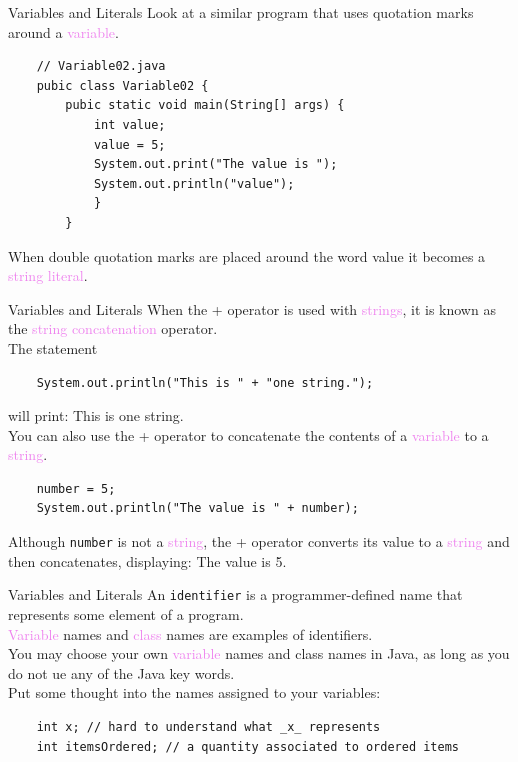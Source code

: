 \documentclass[11pt]{beamer}
\newcommand{\violet}[1]{\textcolor{violet}{#1}}
\begin{document}
\begin{frame}[fragile]{Variables and Literals}
    Look at a similar program that uses quotation marks around a \violet{variable}.
    \begin{lstlisting}
    // Variable02.java
    pubic class Variable02 {
        pubic static void main(String[] args) {
            int value;
            value = 5;
            System.out.print("The value is ");
            System.out.println("value");
            }
        }
    \end{lstlisting}
    When double quotation marks are placed around the word value it becomes a \violet{string literal}.
\end{frame}

\begin{frame}[fragile]{Variables and Literals}
    When the + operator is used with \violet{strings}, it is known as the \violet{string concatenation} operator. \\ \vspace{1em}
    The statement
    \begin{lstlisting}
    System.out.println("This is " + "one string.");
    \end{lstlisting}
    will print: This is one string. \\ \vspace{1em}
    You can also use the + operator to concatenate the contents of a \violet{variable} to a \violet{string}.
    \begin{lstlisting}
    number = 5;
    System.out.println("The value is " + number);
    \end{lstlisting}
    Although \texttt{number} is not a \violet{string}, the + operator converts its value to a \violet{string} and then concatenates, displaying: The value is 5.
\end{frame}

\begin{frame}[fragile]{Variables and Literals}
    An \texttt{identifier} is a programmer-defined name that represents some element of a program. \\ \vspace{1em}
    \violet{Variable} names and \violet{class} names are examples of identifiers. \\ \vspace{1em}
    You may choose your own \violet{variable} names and class names in Java, as long as you do not ue any of the Java key words. \\ \vspace{1em}
    Put some thought into the names assigned to your variables:
    \begin{lstlisting}
    int x; // hard to understand what _x_ represents
    int itemsOrdered; // a quantity associated to ordered items
    \end{lstlisting}
\end{frame}
\end{document}
